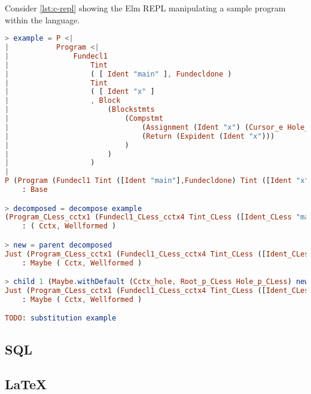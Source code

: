 \begin{lstlisting}[style=inline, caption={Generated functions for substitution for the C language}, label={lst:c-sub}]
\end{lstlisting}

Consider \cref{lst:c-repl} showing the Elm REPL manipulating a sample program within
the language.

\begin{lstlisting}[style=inline, language=elm, caption={Elm REPL demonstration of C language editor}, label={lst:c-repl}]
> example = P <|
|           Program <|
|               Fundecl1
|                   Tint
|                   ( [ Ident "main" ], Fundecldone )
|                   Tint
|                   ( [ Ident "x" ]
|                   , Block
|                       (Blockstmts
|                           (Compstmt
|                               (Assignment (Ident "x") (Cursor_e Hole_e))
|                               (Return (Expident (Ident "x")))
|                           )
|                       )
|                   )
|
P (Program (Fundecl1 Tint ([Ident "main"],Fundecldone) Tint ([Ident "x"],Block (Blockstmts (Compstmt (Assignment (Ident "x") (Cursor_e Hole_e)) (Return (Expident (Ident "x"))))))))
    : Base

> decomposed = decompose example
(Program_CLess_cctx1 (Fundecl1_CLess_cctx4 Tint_CLess ([Ident_CLess "main"],Fundecldone_CLess) Tint_CLess ([Ident_CLess "x"],Block_CLess_cctx1 (Blockstmts_CLess_cctx1 (Compstmt_CLess_cctx1 (Assignment_CLess_cctx2 (Ident_CLess "x") Cctx_hole) (Return_CLess (Expident_CLess (Ident_CLess "x"))))))),Root_e_CLess Hole_e_CLess)
    : ( Cctx, Wellformed )

> new = parent decomposed
Just (Program_CLess_cctx1 (Fundecl1_CLess_cctx4 Tint_CLess ([Ident_CLess "main"],Fundecldone_CLess) Tint_CLess ([Ident_CLess "x"],Block_CLess_cctx1 (Blockstmts_CLess_cctx1 (Compstmt_CLess_cctx1 Cctx_hole (Return_CLess (Expident_CLess (Ident_CLess "x"))))))),Root_s_CLess (Assignment_CLess (Ident_CLess "x") Hole_e_CLess))
    : Maybe ( Cctx, Wellformed )

> child 1 (Maybe.withDefault (Cctx_hole, Root_p_CLess Hole_p_CLess) new)
Just (Program_CLess_cctx1 (Fundecl1_CLess_cctx4 Tint_CLess ([Ident_CLess "main"],Fundecldone_CLess) Tint_CLess ([Ident_CLess "x"],Block_CLess_cctx1 (Blockstmts_CLess_cctx1 (Compstmt_CLess_cctx1 (Assignment_CLess_cctx1 Cctx_hole Hole_e_CLess) (Return_CLess (Expident_CLess (Ident_CLess "x"))))))),Root_id_CLess (Ident_CLess "x"))
    : Maybe ( Cctx, Wellformed )

TODO: substitution example
\end{lstlisting}

\subsection{SQL}

\subsection{\LaTeX}
